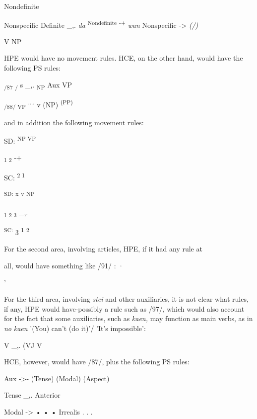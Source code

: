 \ea\label{ex:95}

\glt
\z

\ea\label{ex:96}

\glt
\z

Nondefinite

Nonspecific Definite \_,. \textit{da} \textsuperscript{Nondefinite }\textsuperscript{{}-+ }\textit{wan} Nonspecific {}-{\textgreater} \textit{(/)}

V NP

HPE would have no movement rules. HCE, on the other hand, would have the following PS rules:

\textsubscript{/87}\textsubscript{ }\textsubscript{/ }s \_,. \textsubscript{NP }Aux VP

\textsubscript{/88/ VP}\textsubscript{ }\textsuperscript{.... }v (NP) \textsuperscript{(PP)}

and in addition the following movement rules:

\ea\label{ex:89}
SD: \textsuperscript{NP VP}
\glt
\z

\textsubscript{1 2 }{}-+

SC: \textsuperscript{2 1}

\ea\label{ex:90}
 \textsuperscript{SD: }\textsuperscript{x }\textsuperscript{v }\textsuperscript{NP}
\glt
\z

\textsubscript{1 2 3 }\_,.

\textsuperscript{SC: }3 \textsuperscript{1 }\textsuperscript{2}

For the second area, involving articles, HPE, if it had any rule at

all, would have something like /91/ : ·

'

For the third area, involving \textit{stei} and other auxiliaries, it is not clear what rules, if any, HPE would have-possibly a rule such as /97/, which would also account for the fact that some auxiliaries, such as \textit{kaen,} may function as main verbs, as in \textit{no} \textit{kaen} '(You) can't (do it)'/ 'It's impossible':

\ea\label{ex:97}
 V \_,. (VJ V
\glt
\z

HCE, however, would have /87/, plus the following PS rules:

\ea\label{ex:98}
 Aux {}-{\textgreater}- (Tense) (Modal) (Aspect)
\glt
\z

\ea\label{ex:99}
 Tense \_,. Anterior
\glt
\z

\ea\label{ex:100}
 Modal {}-{\textgreater} • • • Irrealis . . .
\glt
\z

